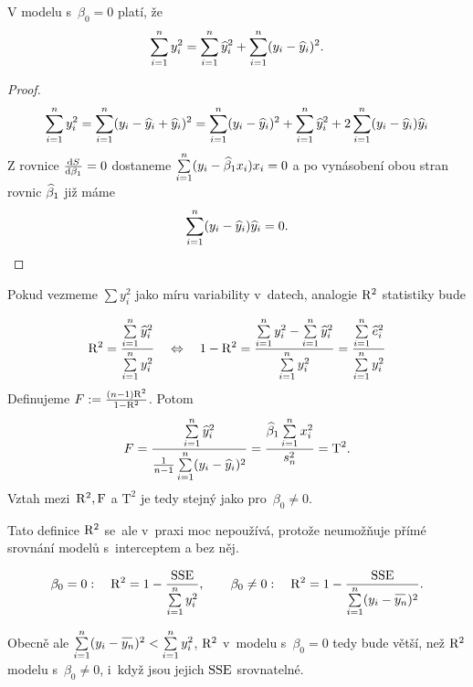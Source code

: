 \begin{theorem}
V modelu s~$\beta_0 = 0$ platí, že
 $$
 \sum\limits_{i=1}^{n} y_i^2 = \sum\limits_{i=1}^{n} \widehat{y}_i^2 + \sum\limits_{i=1}^{n} (y_i - \widehat{y}_i)^2.
 $$
\end{theorem}

\begin{proof}
 $$
 \sum\limits_{i=1}^{n} y_i^2 = \sum\limits_{i=1}^{n} (y_i - \widehat{y}_i + \widehat{y}_i)^2 = \sum\limits_{i=1}^{n} (y_i - \widehat{y}_i)^2 + \sum\limits_{i=1}^{n} \widehat{y}_i^2 + 2 \sum\limits_{i=1}^{n} (y_i - \widehat{y}_i) \widehat{y}_i
 $$
 Z rovnice $\frac{\mathrm{d} S}{\mathrm{d} \beta_1} = 0$ dostaneme $\sum\limits_{i=1}^{n} (y_i - \widehat{\beta}_1 x_i) x_i = 0
 $ a po vynásobení obou stran rovnic $\widehat{\beta}_1$ již máme
 $$
 \sum\limits_{i=1}^{n} (y_i - \widehat{y}_i) \widehat{y}_i = 0.
 $$
\end{proof}
Pokud vezmeme $\sum y_i^2$ jako míru variability v~datech, analogie $\mathrm{R}^2$ statistiky bude

 $$
  \mathrm{R}^2 = \frac{\sum\limits_{i=1}^{n} \widehat{y}_i^2}{\sum\limits_{i=1}^{n} y_i^2} \quad \Leftrightarrow \quad
  1 - \mathrm{R}^2 = \frac{\sum\limits_{i=1}^{n} y_i^2 - \sum\limits_{i=1}^{n} \widehat{y}_i^2}{\sum\limits_{i=1}^{n} y_i^2} = \frac{\sum\limits_{i=1}^{n} \widehat{e}_i^2}{\sum\limits_{i=1}^{n} y_i^2 }
 $$
Definujeme $F : = \frac{(n-1) \mathrm{R}^2}{1 - \mathrm{R}^2}$. Potom
 $$
  F = \frac{\sum\limits_{i=1}^{n} \widehat{y}_i^2 }{\frac{1}{n-1} \sum\limits_{i=1}^{n} (y_i - \widehat{y}_i)^2 } = \frac{\widehat{\beta}_1 \sum\limits_{i=1}^{n} x_i^2 }{ s_n^2} = \text{T}^2.
 $$
Vztah mezi~$\mathrm{R}^2, \mathrm{F}$ a $\mathrm{T}^2$ je tedy stejný jako pro~$\beta_0 \neq 0$.

\begin{remark}
  Tato definice $\mathrm{R}^2$ se~ale v~praxi moc nepoužívá, protože neumožňuje přímé srovnání modelů s~interceptem a bez něj.
\end{remark}
 $$
  \beta_0 = 0  : \quad \RMR^2 = 1 - \frac{\SSE}{\sumin y_i^2},
\qquad
  \beta_0 \neq 0  : \quad \RMR^2 = 1 - \frac{\SSE}{\sumin (y_i - \oynn)^2}.
 $$

Obecně ale $\sumin (y_i - \oynn)^2 < \sumin y_i^2$, $\mathrm{R}^2$ v~modelu s~$\beta_0 = 0$ tedy bude větší, než $\mathrm{R}^2$ modelu s~$\beta_0 \neq 0$, i~když jsou jejich $\mathrm{SSE}$ srovnatelné.

